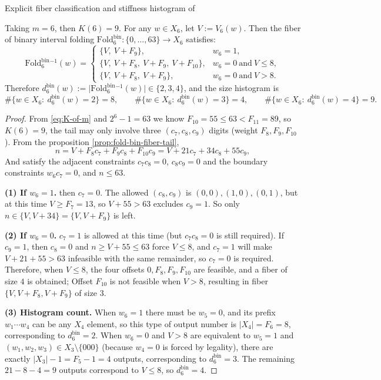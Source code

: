 Explicit fiber classification and stiffness histogram of \begin{corollary}[\texorpdfstring{$m=6$}{m=6}]\label{cor:fold-bin-m6-fiber-hist}
Taking \(m=6\), then \(K(6)=9\). For any \(w\in X_6\), let \(V:=V_6(w)\).
Then the fiber of binary interval folding \(\mathrm{Fold}^{\mathrm{bin}}_6:\{0,\dots,63\}\to X_6\) satisfies:
\[
\mathrm{Fold}^{\mathrm{bin}}_6{}^{-1}(w)=
\begin{cases}
\{V,\ V+F_{9}\}, & w_6=1,\\[4pt]
\{V,\ V+F_{8},\ V+F_{9},\ V+F_{10}\}, & w_6=0\ \text{and}\ V\le 8,\\[4pt]
\{V,\ V+F_{8},\ V+F_{9}\}, & w_6=0\ \text{and}\ V> 8.
\end{cases}
\]
Therefore \(d^{\mathrm{bin}}_6(w):=\bigl|\mathrm{Fold}^{\mathrm{bin}}_6{}^{-1}(w)\bigr|\in\{2,3,4\}\), and the size histogram is
\[
\#\{w\in X_6:\ d^{\mathrm{bin}}_6(w)=2\}=8,\qquad
\#\{w\in X_6:\ d^{\mathrm{bin}}_6(w)=3\}=4,\qquad
\#\{w\in X_6:\ d^{\mathrm{bin}}_6(w)=4\}=9.
\]
\end{corollary}
\begin{proof}
From \eqref{eq:K-of-m} and \(2^6-1=63\) we know \(F_{10}=55\le 63<F_{11}=89\), so \(K(6)=9\), the tail may only involve three \((c_7,c_8,c_9)\) digits (weight \(F_8,F_9,F_{10}\)).
From the proposition \ref{prop:fold-bin-fiber-tail},
\[
n=V+F_8c_7+F_9c_8+F_{10}c_9
=V+21c_7+34c_8+55c_9,
\]
And satisfy the adjacent constraints \(c_7c_8=0\), \(c_8c_9=0\) and the boundary constraints \(w_6c_7=0\), and \(n\le 63\).
\par
\noindent\textbf{(1) If \(w_6=1\). } then \(c_7=0\).
The allowed \((c_8,c_9)\) is \((0,0),(1,0),(0,1)\), but at this time \(V\ge F_7=13\), so \(V+55>63\) excludes \(c_9=1\).
So only \(n\in\{V,V+34\}=\{V,V+F_9\}\) is left.
\par
\noindent\textbf{(2) If \(w_6=0\). } \(c_7=1\) is allowed at this time (but \(c_7c_8=0\) is still required).
If \(c_9=1\), then \(c_8=0\) and \(n\ge V+55\le 63\) force \(V\le 8\), and \(c_7=1\) will make \(V+21+55>63\) infeasible with the same remainder, so \(c_7=0\) is required.
Therefore, when \(V\le 8\), the four offsets \(0,F_8,F_9,F_{10}\) are feasible, and a fiber of size \(4\) is obtained;
Offset \(F_{10}\) is not feasible when \(V>8\), resulting in fiber \(\{V,V+F_8,V+F_9\}\) of size \(3\).
\par
\noindent\textbf{(3) Histogram count. }
When \(w_6=1\) there must be \(w_5=0\), and its prefix \(w_1\cdots w_4\) can be any \(X_4\) element, so this type of output number is \(|X_4|=F_6=8\), corresponding to \(d^{\mathrm{bin}}_6=2\).
When \(w_6=0\) and \(V>8\) are equivalent to \(w_5=1\) and \((w_1,w_2,w_3)\in X_3\setminus\{000\}\) (because \(w_4=0\) is forced by legality), there are exactly \(|X_3|-1=F_5-1=4\) outputs, corresponding to \(d^{\mathrm{bin}}_6=3\).
The remaining \(21-8-4=9\) outputs correspond to \(V\le 8\), so \(d^{\mathrm{bin}}_6=4\).
\end{proof}

